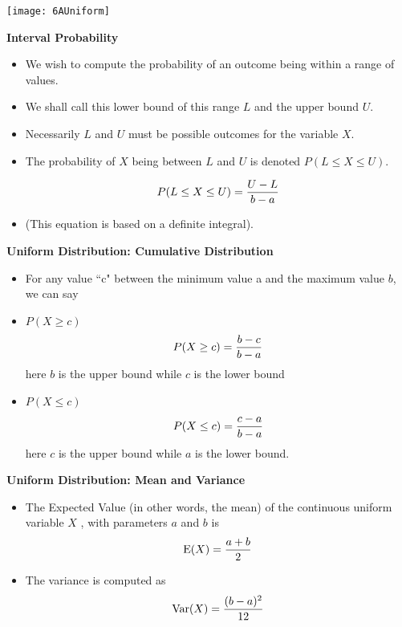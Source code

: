 {
\Large



\begin{center}
\texttt{[image: 6AUniform]}

\end{center}
}



{\textbf{Interval Probability}

\begin{itemize}
\item We wish to compute the probability of an outcome being within a range of values.
\item We shall call this lower bound of this range $L$ and the upper bound $ U$.
\item Necessarily $L$ and $U$ must be possible outcomes for the variable $X$.
\item The probability of $X$ being between $L$ and $U$ is denoted $P( L \leq X \leq U )$.

\begin{framed}
\[
P( L \leq X \leq U ) = { U - L \over b - a}
\]
\end{framed}
\item (This equation is based on a definite integral).
\end{itemize}
}

{
\textbf{Uniform Distribution: Cumulative Distribution}
\Large
\begin{itemize}

\item For any value ``c" between the minimum value a and the maximum
value $b$, we can say
\item $P(X \geq c)$ \[P(X \geq c) = {b-c \over b-a}\]
here $b$ is the upper bound while $c$ is the lower bound
\item $P(X \leq c)$ \[P(X \leq c) = {c-a \over b-a}\]
here $c$ is the upper bound while $a$ is the lower bound.
\end{itemize}
}

{
\textbf{Uniform Distribution: Mean and Variance}
\Large
\begin{itemize}
\item The Expected Value (in other words, the mean)  of the continuous uniform variable $X$ , with parameters $a$ and $b$ is
\[ \mathrm{E}(X) = {a+b \over 2}\]
\item The variance is computed as
\[ \mathrm{Var}(X) = {(b-a)^2 \over 12}\]
\end{itemize}
}

